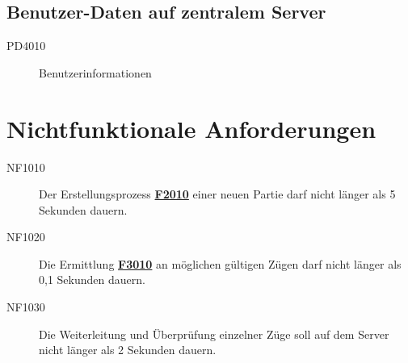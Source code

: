 \documentclass[parskip=full]{scrartcl}
\begin{document}
\subsection{Benutzer-Daten auf zentralem Server}
\begin{description}
	\item[PD4010]  Benutzerinformationen
\end{description}
\newpage
\section{Nichtfunktionale Anforderungen}
\begin{description}
	
	\item[NF1010] Der Erstellungsprozess \hyperlink{F2010}{\textbf{F2010}} einer neuen Partie darf nicht länger als 5 Sekunden dauern.
\item[NF1020] Die Ermittlung \hyperlink{F3010}{\textbf{F3010}} an möglichen gültigen Zügen darf nicht länger als 0,1 Sekunden dauern.
\item[NF1030] Die Weiterleitung und Überprüfung einzelner Züge soll auf dem Server nicht länger als 2 Sekunden dauern.

\end{description}
\newpage
\end{document}
